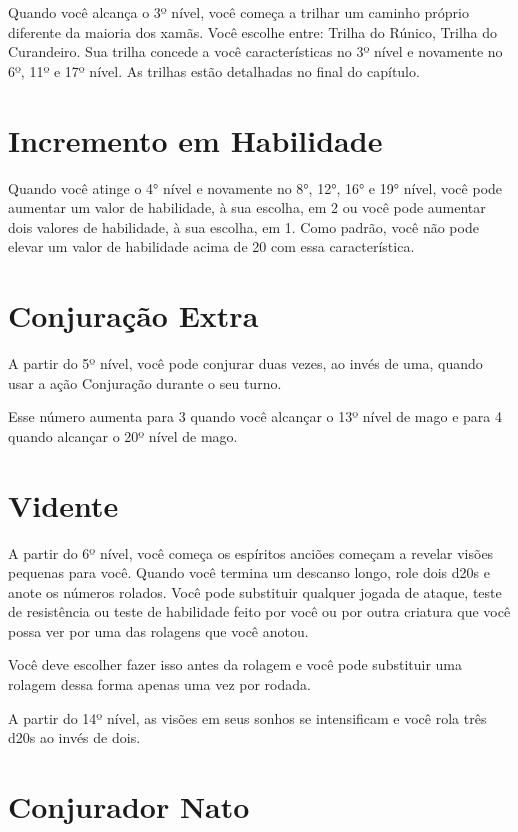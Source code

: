 \begin{multicols}{2}
Quando você alcança o 3º nível, você começa a trilhar um caminho próprio
diferente da maioria dos xamãs. Você escolhe entre: Trilha do Rúnico, Trilha do
Curandeiro. Sua trilha concede a você características no 3º nível e novamente no
6º, 11º e 17º nível. As trilhas estão detalhadas no final do capítulo.

\section*{Incremento em Habilidade}

Quando você atinge o 4° nível e novamente no 8°, 12°, 16° e 19° nível, você pode
aumentar um valor de habilidade, à sua escolha, em 2 ou você pode aumentar dois
valores de habilidade, à sua escolha, em 1. Como padrão, você não pode elevar um
valor de habilidade acima de 20 com essa característica.

\section*{Conjuração Extra}%

A partir do 5º nível, você pode conjurar duas vezes, ao invés de uma, quando
usar a ação Conjuração durante o seu turno.

Esse número aumenta para 3 quando você alcançar o 13º nível de mago e para 4
quando alcançar o 20º nível de mago.

\section*{Vidente}%

A partir do 6º nível, você começa os espíritos anciões começam a revelar
visões pequenas para você. Quando você termina um descanso longo, role dois d20s
e anote os números rolados. Você pode substituir qualquer jogada de ataque,
teste de resistência ou teste de habilidade feito por você ou por outra criatura
que você possa ver por uma das rolagens que você anotou.

Você deve escolher fazer isso antes da rolagem e você pode substituir uma
rolagem dessa forma apenas uma vez por rodada.

A partir do 14º nível, as visões em seus sonhos se intensificam e você rola três
d20s ao invés de dois.

\section*{Conjurador Nato}%


\end{multicols}
